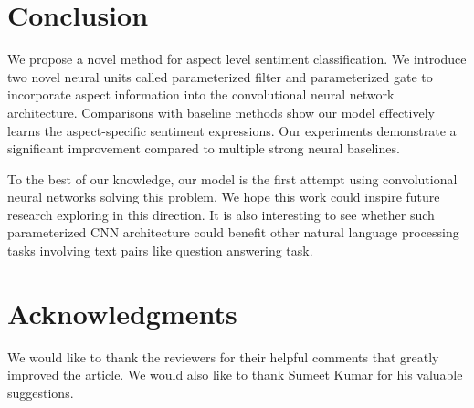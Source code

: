 \documentclass[11pt,a4paper]{article}
\begin{document}
  \section{Conclusion}
We propose a novel method for aspect level sentiment classification. We introduce two novel neural units called parameterized filter and parameterized gate to incorporate aspect information into the convolutional neural network architecture. Comparisons with baseline methods show our model effectively learns the aspect-specific sentiment expressions. Our experiments demonstrate a significant improvement compared to multiple strong neural baselines.

To the best of our knowledge, our model is the first attempt using convolutional neural networks solving this problem. We hope this work could inspire future research exploring in this direction. It is also interesting to see whether such parameterized CNN architecture could benefit other natural language processing tasks involving text pairs like question answering task. 
\section*{Acknowledgments}
We would like to thank the reviewers for their helpful comments that greatly improved the
article. We would also like to thank Sumeet Kumar for his valuable suggestions. 


\end{document}
